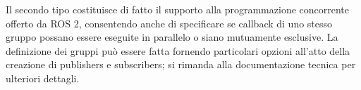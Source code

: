 Il secondo tipo costituisce di fatto il supporto alla programmazione concorrente offerto da ROS 2, consentendo anche di specificare se callback di uno stesso gruppo possano essere eseguite in parallelo o siano mutuamente esclusive. La definizione dei gruppi può essere fatta fornendo particolari opzioni all'atto della creazione di publishers e subscribers; si rimanda alla documentazione tecnica per ulteriori dettagli.
\vfill\newpage

\indent

\indent

\indent
